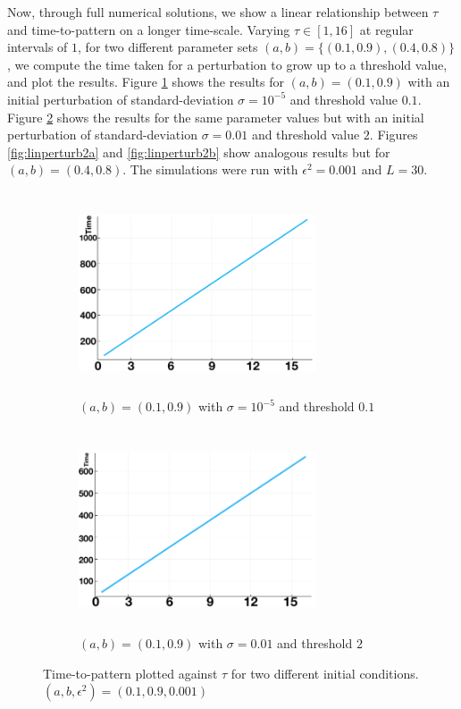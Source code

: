 Now, through full numerical solutions, we show a linear relationship between $\tau$ and time-to-pattern on a longer time-scale. Varying $\tau\in[1,16]$ at regular intervals of $1$, for two different parameter sets $(a,b)=\{(0.1,0.9),(0.4,0.8)\}$, we compute the time taken for a perturbation to grow up to a threshold value, and plot the results. Figure \ref{fig:linperturb1a} shows the results for $(a,b)=(0.1,0.9)$ with an initial perturbation of standard-deviation $\sigma=10^{-5}$ and threshold value $0.1$. Figure \ref{fig:linperturb1b} shows the results for the same parameter values but with an initial perturbation of standard-deviation $\sigma=0.01$ and threshold value $2$. Figures \ref{fig:linperturb2a} and \ref{fig:linperturb2b} show analogous results but for $(a,b)=(0.4,0.8)$. The simulations were run with $\epsilon^2=0.001$ and $L=30$.
\begin{figure}[H]
    \centering
    \begin{subfigure}[b]{0.45\textwidth}
        \centering
        \includegraphics[width=7cm,height=6cm]{longlin2.png}
        \caption{$(a,b)=(0.1,0.9)$ with $\sigma=10^{-5}$ and threshold $0.1$}
        \label{fig:linperturb1a}
    \end{subfigure}
    \hfill
    \begin{subfigure}[b]{0.45\textwidth}
        \centering
        \includegraphics[width=7cm,height=6cm]{longlin1.png}
        \caption{$(a,b)=(0.1,0.9)$ with $\sigma=0.01$ and threshold $2$}
        \label{fig:linperturb1b}
    \end{subfigure}
    \caption{Time-to-pattern plotted against $\tau$ for two different initial conditions. $(a,b,\epsilon^2)=(0.1,0.9,0.001)$}
    \label{}
\end{figure}

